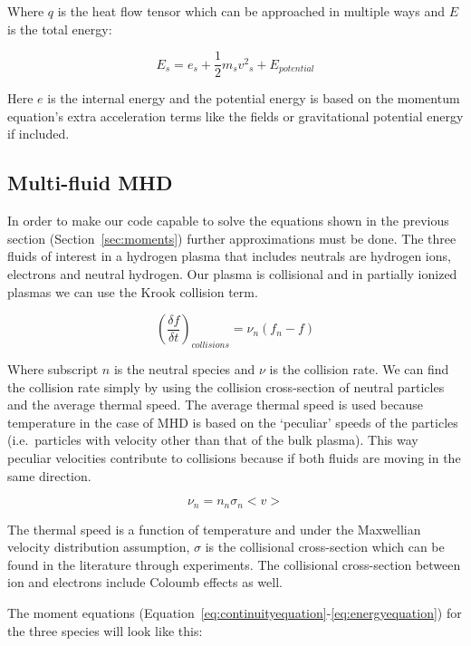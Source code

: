 \documentclass[12pt,upcase]{umlthesis}
\begin{document}
Where $q$ is the heat flow tensor which can be approached in multiple ways and $E$ is the total energy:

\begin{equation}\label{eq:energy}
	E_s = e_s + \frac{1}{2} m_s {v^2}_s + E_{potential}
\end{equation}

Here $e$ is the internal energy and the potential energy is based on the momentum equation's extra acceleration terms like the fields or gravitational potential energy if included.

\subsection{Multi-fluid MHD}\label{sec:multifluidmhd}

In order to make our code capable to solve the equations shown in the previous section (Section~\ref{sec:moments}) further approximations must be done. The three fluids of interest in a hydrogen plasma that includes neutrals are hydrogen ions, electrons and neutral hydrogen. Our plasma is collisional and in partially ionized plasmas we can use the Krook collision term.

\begin{equation}\label{eq:krook}
	{(\frac{\delta f}{\delta t})}_{collisions} = \nu_n (f_n - f)
\end{equation}

Where subscript $n$ is the neutral species and $\nu$ is the collision rate. We can find the collision rate simply by using the collision cross-section of neutral particles and the average thermal speed. The average thermal speed is used because temperature in the case of MHD is based on the `peculiar' speeds of the particles (i.e.\ particles with velocity other than that of the bulk plasma). This way peculiar velocities contribute to collisions because if both fluids are moving in the same direction.

\begin{equation}\label{eq:collisionrate}
	\nu_n = n_n \sigma_n <v>
\end{equation}

The thermal speed is a function of temperature and under the Maxwellian velocity distribution assumption, $\sigma$ is the collisional cross-section which can be found in the literature through experiments. The collisional cross-section between ion and electrons include Coloumb effects as well.

The moment equations (Equation~\ref{eq:continuityequation}-\ref{eq:energyequation}) for the three species will look like this:
\end{document}
